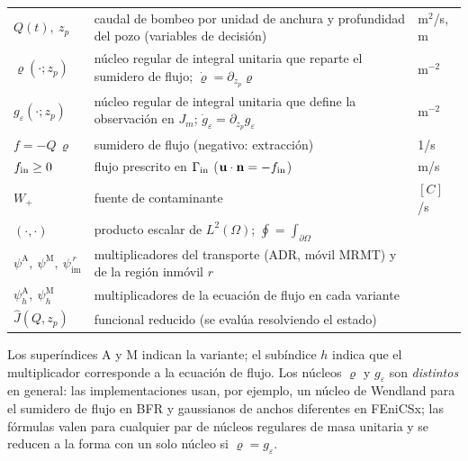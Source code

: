 \documentclass[11pt]{article}
\numberwithin{equation}{section}
\theoremstyle{plain}
\theoremstyle{definition}
\theoremstyle{remark}
\newcommand{\bu}{\mathbf{u}}
\newcommand{\bn}{\mathbf{n}}
\newcommand{\Ceps}{g_\varepsilon}              %
\newcommand{\Nuc}{\varrho}                      %
\newcommand{\im}{\mathrm{im}}
\newcommand{\pA}{\psi^{\mathrm A}}          %
\newcommand{\pM}{\psi^{\mathrm M}}          %
\newcommand{\pim}{\psi_{\im}}               %
\newcommand{\phA}{\psi_h^{\mathrm A}}       %
\newcommand{\phM}{\psi_h^{\mathrm M}}       %
\begin{document}
\begin{center}
\begin{tabular}{p{3.3cm}p{9.2cm}p{2.3cm}}
$Q(t),\ z_p$ & caudal de bombeo por unidad de anchura y profundidad del pozo (variables de decisión) & m$^2$/s, m \\
$\Nuc(\cdot;z_p)$ & núcleo regular de integral unitaria que reparte el sumidero de flujo; $\dot\Nuc=\partial_{z_p}\Nuc$ & m$^{-2}$ \\
$\Ceps(\cdot;z_p)$ & núcleo regular de integral unitaria que define la observación en $J_m$; $\dot g_\varepsilon=\partial_{z_p}g_\varepsilon$ & m$^{-2}$ \\
$f=-Q\,\Nuc$ & sumidero de flujo (negativo: extracción) & 1/s \\
$f_{\rm in}\ge0$ & flujo prescrito en $\Gamma_{\rm in}$ ($\bu\cdot\bn=-f_{\rm in}$) & m/s \\
$W_+$ & fuente de contaminante & $[C]$/s \\
$(\cdot,\cdot)$ & producto escalar de $L^2(\Omega)$; $\oint=\int_{\partial\Omega}$ & \\
$\pA,\ \pM,\ \pim^{\,r}$ & multiplicadores del transporte (ADR, móvil MRMT) y de la región inmóvil $r$ & \\
$\phA,\ \phM$ & multiplicadores de la ecuación de flujo en cada variante & \\
$\hat J(Q,z_p)$ & funcional reducido (se evalúa resolviendo el estado) & \\
\bottomrule
\end{tabular}
\end{center}
Los superíndices $\mathrm A$ y $\mathrm M$ indican la variante; el subíndice $h$ indica que el multiplicador
corresponde a la ecuación de flujo. Los núcleos $\Nuc$ y $\Ceps$ son \emph{distintos} en general: las implementaciones usan, por ejemplo, un
núcleo de Wendland para el sumidero de flujo en BFR y gaussianos de anchos diferentes en FEniCSx; las fórmulas valen para cualquier par de
núcleos regulares de masa unitaria y se reducen a la forma con un solo núcleo si $\Nuc=\Ceps$.
\end{document}
